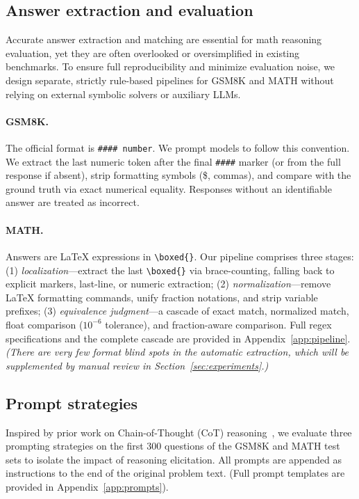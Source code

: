 \documentclass{article}
\begin{document}
\subsection{Answer extraction and evaluation}
\label{sec:extraction}
Accurate answer extraction and matching are essential for math reasoning evaluation, yet they are often overlooked or oversimplified in existing benchmarks. To ensure full reproducibility and minimize evaluation noise, we design separate, strictly rule-based pipelines for GSM8K and MATH without relying on external symbolic solvers  or auxiliary LLMs.

\paragraph{GSM8K.} The official format is \texttt{\#\#\#\# number}. We prompt models to follow this convention. We extract the last numeric token after the final \texttt{\#\#\#\#} marker (or from the full response if absent), strip formatting symbols (\$, commas), and compare with the ground truth via exact numerical equality. Responses without an identifiable answer are treated as incorrect.

\paragraph{MATH.} Answers are LaTeX expressions in \texttt{\textbackslash boxed\{\}}. Our pipeline comprises three stages: (1) \textit{localization}---extract the last \texttt{\textbackslash boxed\{\}} via brace-counting, falling back to explicit markers, last-line, or numeric extraction; (2) \textit{normalization}---remove LaTeX formatting commands, unify fraction notations, and strip variable prefixes; (3) \textit{equivalence judgment}---a cascade of exact match, normalized match, float comparison ($10^{-6}$ tolerance), and fraction-aware comparison. Full regex specifications and the complete cascade are provided in Appendix~\ref{app:pipeline}.
\textit{(There are very few format blind spots in the automatic extraction, which will be supplemented by manual review in Section~\ref{sec:experiments}.)}

\subsection{Prompt strategies}
\label{sec:prompts}
Inspired by prior work on Chain-of-Thought (CoT) reasoning~\cite{wei2022chain, kojima2022large}, we evaluate three prompting strategies on the first 300 questions of the GSM8K and MATH test sets to isolate the impact of reasoning elicitation. All prompts are appended as instructions to the end of the original problem text. (Full prompt templates are provided in Appendix~\ref{app:prompts}).
\end{document}
